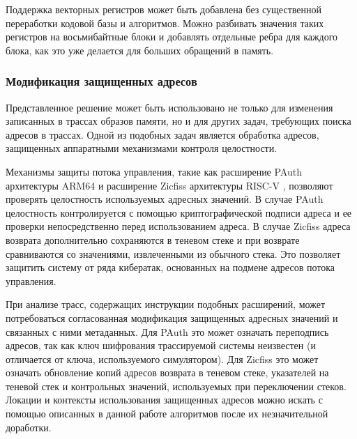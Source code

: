 Поддержка векторных регистров может быть добавлена без существенной переработки кодовой базы и алгоритмов. Можно разбивать значения таких регистров на восьмибайтные блоки и добавлять отдельные ребра для каждого блока, как это уже делается для больших обращений в память.

\subsubsection{Модификация защищенных адресов} \label{sec:application_crypto}

Представленное решение может быть использовано не только для изменения записанных в трассах образов памяти, но и для других задач, требующих поиска адресов в трассах. Одной из подобных задач является обработка адресов, защищенных аппаратными механизмами контроля целостности.

Механизмы защиты потока управления, такие как расширение PAuth архитектуры ARM64 \cite{arm_pointer_authentication,pacman} и расширение Zicfiss архитектуры RISC-V \cite{riscv_cfi}, позволяют проверять целостность используемых адресных значений. В случае PAuth целостность контролируется с помощью криптографической подписи адреса и ее проверки непосредственно перед использованием адреса. В случае Zicfiss адреса возврата дополнительно сохраняются в теневом стеке и при возврате сравниваются со значениями, извлеченными из обычного стека. Это позволяет защитить систему от ряда кибератак, основанных на подмене адресов потока управления.

При анализе трасс, содержащих инструкции подобных расширений, может потребоваться согласованная модификация защищенных адресных значений и связанных с ними метаданных. Для PAuth это может означать переподпись адресов, так как ключ шифрования трассируемой системы неизвестен (и отличается от ключа, используемого симулятором). Для Zicfiss это может означать обновление копий адресов возврата в теневом стеке, указателей на теневой стек и контрольных значений, используемых при переключении стеков. Локации и контексты использования защищенных адресов можно искать с помощью описанных в данной работе алгоритмов после их незначительной доработки.
